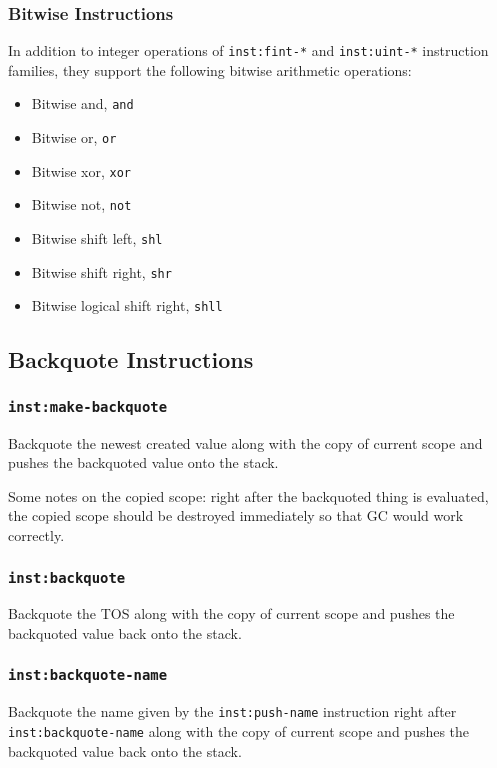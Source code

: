\documentclass{article}
\newcommand{\inst}[1] {\texttt{inst:#1}}
\begin{document}
\subsubsection{Bitwise Instructions}

In addition to integer operations of \inst{fint-*} and \inst{uint-*} instruction families, they support the following bitwise arithmetic operations:
\begin{itemize}
\item Bitwise and, \texttt{and}
\item Bitwise or, \texttt{or}
\item Bitwise xor, \texttt{xor}
\item Bitwise not, \texttt{not}
\item Bitwise shift left, \texttt{shl}
\item Bitwise shift right, \texttt{shr}
\item Bitwise logical shift right, \texttt{shll}
\end{itemize}

\subsection{Backquote Instructions}

\subsubsection{\inst{make-backquote}}

Backquote the newest created value along with the copy of current scope and pushes the backquoted value onto the stack.

Some notes on the copied scope: right after the backquoted thing is evaluated, the copied scope should be destroyed immediately so that GC would work correctly.

\subsubsection{\inst{backquote}}

Backquote the TOS along with the copy of current scope and pushes the backquoted value back onto the stack.

\subsubsection{\inst{backquote-name}}

Backquote the name given by the \inst{push-name} instruction right after \inst{backquote-name} along with the copy of current scope and pushes the backquoted value back onto the stack.
\end{document}
